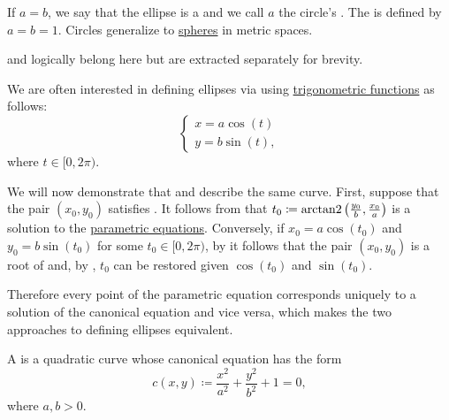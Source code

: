 \begin{definition}
\begin{defenum}
    If \( a = b \), we say that the ellipse is a  and we call \( a \) the circle's . The  is defined by \( a = b = 1 \). Circles generalize to \hyperref[def:metric_space/sphere]{spheres} in metric spaces.

     and  logically belong here but are extracted separately for brevity.

    We are often interested in defining ellipses via  using \hyperref[def:trigonometric_functions]{trigonometric functions} as follows:
    \begin{equation}\label{def:quadratic_plane_curve/ellipse/parametric_equations}
      \begin{cases}
        x = a \cos(t) \\
        y = b \sin(t),
      \end{cases}
    \end{equation}
    where \( t \in [0, 2\pi) \).

    We will now demonstrate that  and  describe the same curve. First, suppose that the pair \( (x_0, y_0) \) satisfies . It follows from  that \( t_0 \coloneqq \operatorname{arctan2}\left(\tfrac {y_0} b, \tfrac {x_0} a \right) \) is a solution to the \hyperref[def:quadratic_plane_curve/ellipse/parametric_equations]{parametric equations}. Conversely, if \( x_0 = a \cos(t_0) \) and \( y_0 = b \sin(t_0) \) for some \( t_0 \in [0, 2\pi) \), by  it follows that the pair \( (x_0, y_0) \) is a root of  and, by , \( t_0 \) can be restored given \( \cos(t_0) \) and \( \sin(t_0) \).

    Therefore every point of the parametric equation  corresponds uniquely to a solution of the canonical equation  and vice versa, which makes the two approaches to defining ellipses equivalent.

     A  is a quadratic curve whose canonical equation has the form
    \begin{equation}\label{def:quadratic_plane_curve/hyperbola/canonical_equation}
      c(x, y) \coloneqq \frac {x^2} {a^2} + \frac {y^2} {b^2} + 1 = 0,
    \end{equation}
    where \( a, b > 0 \).


\end{defenum}
\end{definition}
